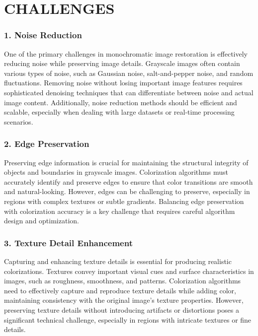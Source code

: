 \chapter{CHALLENGES}

\subsection*{1. Noise Reduction}

One of the primary challenges in monochromatic image restoration is effectively reducing noise while preserving image details. Grayscale images often contain various types of noise, such as Gaussian noise, salt-and-pepper noise, and random fluctuations. Removing noise without losing important image features requires sophisticated denoising techniques that can differentiate between noise and actual image content. Additionally, noise reduction methods should be efficient and scalable, especially when dealing with large datasets or real-time processing scenarios.

\subsection*{2. Edge Preservation}

Preserving edge information is crucial for maintaining the structural integrity of objects and boundaries in grayscale images. Colorization algorithms must accurately identify and preserve edges to ensure that color transitions are smooth and natural-looking. However, edges can be challenging to preserve, especially in regions with complex textures or subtle gradients. Balancing edge preservation with colorization accuracy is a key challenge that requires careful algorithm design and optimization.

\subsection*{3. Texture Detail Enhancement}

Capturing and enhancing texture details is essential for producing realistic colorizations. Textures convey important visual cues and surface characteristics in images, such as roughness, smoothness, and patterns. Colorization algorithms need to effectively capture and reproduce texture details while adding color, maintaining consistency with the original image's texture properties. However, preserving texture details without introducing artifacts or distortions poses a significant technical challenge, especially in regions with intricate textures or fine details.

